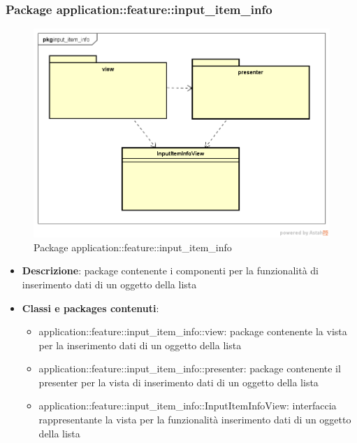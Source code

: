 \subsubsection{Package application::feature::input\_item\_info}
\label{Package application::feature::input_item_info}
\begin{figure}[H]
	\centering
	\includegraphics[scale=0.5]{Sezioni/Packages/Application/input_item_info.png}
	\caption{Package application::feature::input\_item\_info}
\end{figure}
\begin{itemize}
	\item \textbf{Descrizione}: package contenente i componenti per la funzionalità di inserimento dati di un oggetto della lista
	\item \textbf{Classi e packages contenuti}:
	\begin{itemize}
	\item application::feature::input\_item\_info::view: package contenente la vista per la inserimento dati di un oggetto della lista
	\item application::feature::input\_item\_info::presenter: package contenente il presenter per la vista di inserimento dati di un oggetto della lista
	\item application::feature::input\_item\_info::InputItemInfoView: interfaccia rappresentante la vista per la funzionalità inserimento dati di un oggetto della lista
	\end{itemize}
\end{itemize}

